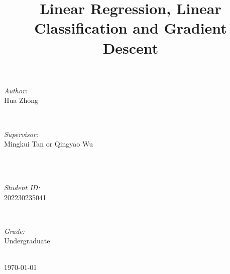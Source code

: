 \documentclass[journal, a4paper]{IEEEtran}
\begin{document}
\begin{titlepage}
\begin{minipage}{0.4\textwidth}
\begin{flushleft} \large
\emph{Author:}\\
Hua Zhong %
\end{flushleft}
\end{minipage}
~
\begin{minipage}{0.4\textwidth}
\begin{flushright} \large
\emph{Supervisor:} \\
Mingkui Tan or Qingyao Wu %
\end{flushright}
\end{minipage}\\[2cm]
~
\begin{minipage}{0.4\textwidth}
\begin{flushleft} \large
\emph{Student ID:}\\
202230235041
\end{flushleft}
\end{minipage}
~
\begin{minipage}{0.4\textwidth}
\begin{flushright} \large
\emph{Grade:} \\
Undergraduate
\end{flushright}
\end{minipage}\\[2cm]



{\large \today}\\[2cm] %



\vfill %

\end{titlepage}

	\title{Linear Regression, Linear Classification and Gradient Descent}
	\maketitle
\end{document}
